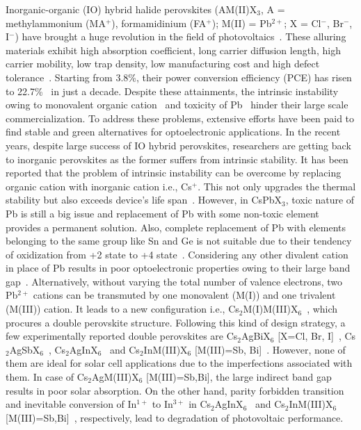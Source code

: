 \documentclass[journal=jpclcd,manuscript=letter]{achemso}
\begin{document}
Inorganic-organic (IO) hybrid halide perovskites (AM(\textrm{II})X$_3$, A = methylammonium (MA$^+$), formamidinium (FA$^+$); M(\textrm{II}) = Pb$^{2+}$; X = Cl$^{-}$, Br$^{-}$, I$^{-}$) have brought a huge revolution in the field of photovoltaics~\cite{frost2014atomistic, de2016guanidinium, zhang2018planar}. These alluring materials exhibit high absorption coefficient, long carrier diffusion length, high carrier mobility, low trap density, low manufacturing cost and high defect tolerance~\cite{r1,doi:10.1021/jz500858a,PhysRevB.101.054108,doi:10.1021/acsenergylett.6b00196}. Starting from 3.8\%, their power conversion efficiency (PCE) has risen to 22.7\%~\cite{r1, r2, r3} in just a decade. Despite these attainments, the intrinsic instability owing to monovalent organic cation~\cite{park2019intrinsic} and toxicity of Pb~\cite{babayigit2016toxicity} hinder their large scale commercialization. To address these problems, extensive efforts have been paid to find stable and green alternatives for optoelectronic applications. In the recent years, despite large success of IO hybrid perovskites, researchers are getting back to inorganic perovskites as the former suffers from intrinsic stability. It has been reported that the problem of intrinsic instability can be overcome by replacing organic cation with inorganic cation i.e., Cs$^{+}$. This not only upgrades the thermal stability but also exceeds device's life span~\cite{kulbak2015important, liang2016all}. However, in CsPbX$_3$, toxic nature of Pb is still a big issue and replacement of Pb with some non-toxic element provides a permanent solution. Also, complete replacement of Pb with elements belonging to the same group like Sn and Ge is not suitable due to their tendency of oxidization from +2 state to +4 state~\cite{S1, S2}. Considering any other divalent cation in place of Pb results in poor optoelectronic properties owing to their large band gap~\cite{S3, S4}. Alternatively, without varying the total number of valence electrons, two Pb$^{2+}$ cations can be transmuted by one monovalent (M(I)) and one trivalent (M(III)) cation. It leads to a new configuration i.e., Cs$_{2}$M(I)M(III)X$_{6}$~\cite{cai2019high,chen2019yb}, which procures a double perovskite structure. Following this kind of design strategy, a few experimentally reported double perovskites are Cs$_{2}$AgBiX$_{6}$ [X=Cl, Br, I]~\cite{S5, S6, S7}, Cs$_{2}$AgSbX$_{6}$~\cite{S8, S9}, Cs$_{2}$AgInX$_{6}$~\cite{S10,locardi2018colloidal} and Cs$_{2}$InM(III)X$_{6}$ [M(III)=Sb, Bi]~\cite{S11}. However, none of them are ideal for solar cell applications due to the imperfections associated with them. In case of Cs$_{2}$AgM(III)X$_{6}$ [M(III)=Sb,Bi], the large indirect band gap results in poor solar absorption. On the other hand, parity forbidden transition and inevitable conversion of In$^{1+}$ to In$^{3+}$ in Cs$_{2}$AgInX$_{6}$~\cite{S10} and Cs$_{2}$InM(III)X$_{6}$ [M(III)=Sb,Bi]~\cite{S13}, respectively, lead to degradation of photovoltaic performance.
\end{document}
